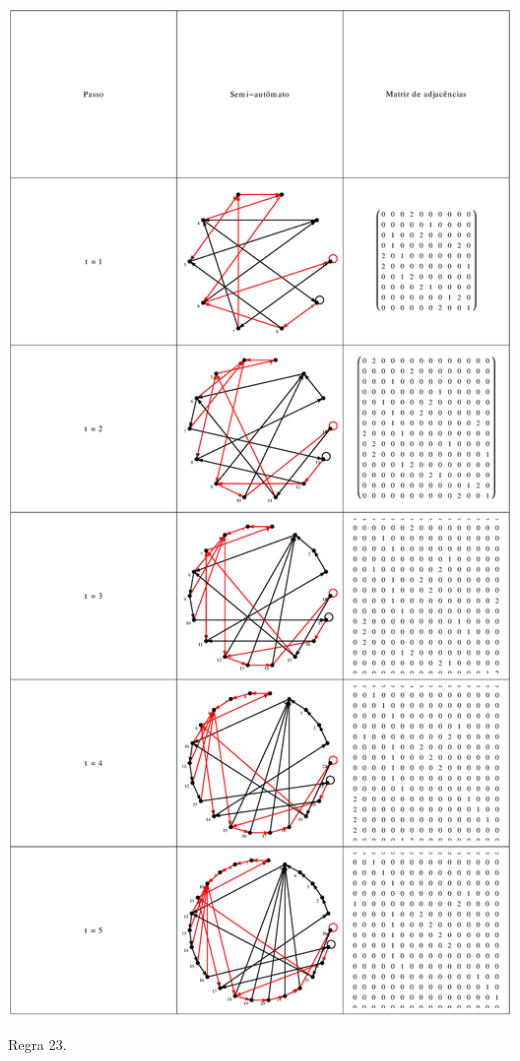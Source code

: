 \documentclass[12pt,a4paper]{article}
\begin{document}
\begin{table}[H]
\begin{center}
\includegraphics[scale=0.32]{img/mat/matr23.eps}
\caption{Regra 23.}
\label{tab:mr23}
\end{center}
\end{table}
\end{document}

